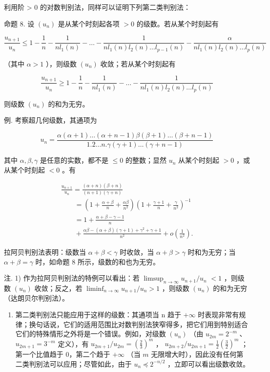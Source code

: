 利用阶 \textgreater{} 0 的对数判别法，同样可以证明下列第二类判别法：

命题 8. 设 \((u_n)\) 是从某个时刻起各项 \(>0\) 的级数。若从某个时刻起有

\[
\frac {u _ {n + 1}}{u _ {n}} \leqslant 1 - \frac {1}{n} - \frac {1}{n l _ {1} (n)} - \dots - \frac {1}{n l _ {1} (n) l _ {2} (n) \dots l _ {p - 1} (n)} - \frac {\alpha}{n l _ {1} (n) l _ {2} (n) \dots l _ {p} (n)}
\]

（其中 \(\alpha > 1\) ），则级数 \((u_n)\) 收敛；若从某个时刻起有

\[
\frac {u _ {n + 1}}{u _ {n}} \geqslant 1 - \frac {1}{n} - \frac {1}{n l _ {1} (n)} - \dots - \frac {1}{n l _ {1} (n) l _ {2} (n) \dots l _ {p} (n)}
\]

则级数 \((u_{n})\) 的和为无穷。

例. 考察超几何级数，其通项为

\[
u _ {n} = \frac {\alpha (\alpha + 1) \dots (\alpha + n - 1) \beta (\beta + 1) \dots (\beta + n - 1)}{1 . 2 \dots n . \gamma (\gamma + 1) \dots (\gamma + n - 1)}
\]

其中 \(\alpha, \beta, \gamma\) 是任意的实数，都不是 \(\leqslant 0\) 的整数；显然 \(u_{n}\) 从某个时刻起 \(>0\) ，或从某个时刻起 \(< 0\) 。有

\[
\begin{array}{l} \frac {u _ {n + 1}}{u _ {n}} = \frac {(\alpha + n) (\beta + n)}{(n + 1) (\gamma + n)} \\ \qquad = \left(1 + \frac {\alpha + \beta}{n} + \frac {\alpha \beta}{n ^ {2}}\right) \left(1 + \frac {\gamma + 1}{n} + \frac {\gamma}{n ^ {2}}\right) ^ {- 1} \\ \qquad = 1 + \frac {\alpha + \beta - \gamma - 1}{n} \\ \qquad + \frac {\alpha \beta - (\alpha + \beta) (\gamma + 1) + \gamma^ {2} + \gamma + 1}{n ^ {2}} + o \left(\frac {1}{n ^ {2}}\right). \end{array}
\]

拉阿贝判别法表明：级数当 \(\alpha +\beta <  \gamma\) 时收敛，当 \(\alpha +\beta >\gamma\) 时和为无穷；当 \(\alpha +\beta = \gamma\) 时，如命题 8 所示，级数的和也为无穷。

注. 1) 作为拉阿贝判别法的特例可以看出：若 \(\limsup_{n\to \infty}u_{n + 1} / u_n\) \(< 1\) ，则级数 \((u_{n})\) 收敛；反之，若 \(\liminf_{n\to \infty}u_{n + 1} / u_n > 1\) ，则级数 \((u_{n})\) 的和为无穷（达朗贝尔判别法）。

\begin{enumerate}
\def\labelenumi{\arabic{enumi})}
\setcounter{enumi}{1}
\tightlist
\item
  第二类判别法只能应用于这样的级数：其通项当 n 趋于 \(+\infty\) 时表现非常有规律；换句话说，它们的适用范围比对数判别法狭窄得多，把它们用到特别适合它们的特殊情形之外将是一个错误。例如，对级数 \((u_{n})\) （由 \(u_{2m} = 2^{-m}\) 、 \(u_{2m + 1} = 3^{-m}\) 定义），有 \(u_{2m + 1} / u_{2m} = \left(\frac{2}{3}\right)^{m}\) ， \(u_{2m + 2} / u_{2m + 1} = \frac{1}{2}\left(\frac{3}{2}\right)^{m}\) ；第一个比值趋于 0，第二个趋于 \(+\infty\) （当 \(m\) 无限增大时），因此没有任何第二类判别法可以应用；尽管如此，由于 \(u_{n} \preccurlyeq 2^{-n / 2}\) ，立即可以看出级数收敛。
\end{enumerate}

